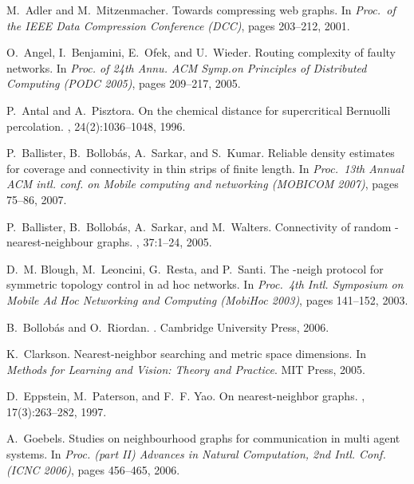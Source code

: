 \documentclass[11pt]{article}
\begin{document}

\begin{thebibliography}{10}

M.~Adler and M.~Mitzenmacher.
\newblock Towards compressing web graphs.
\newblock In {\em Proc.\ of the IEEE Data Compression Conference (DCC)}, pages
  203--212, 2001.

O.~Angel, I.~Benjamini, E.~Ofek, and U.~Wieder.
\newblock Routing complexity of faulty networks.
\newblock In {\em Proc. of 24th Annu. ACM Symp.on Principles of Distributed
  Computing (PODC 2005)}, pages 209--217, 2005.

P.~Antal and A.~Pisztora.
\newblock On the chemical distance for supercritical {Bernuolli} percolation.
, 24(2):1036--1048, 1996.

P.~Ballister, B.~Bollob\'as, A.~Sarkar, and S.~Kumar.
\newblock Reliable density estimates for coverage and connectivity in thin
  strips of finite length.
\newblock In {\em Proc.~13th Annual ACM intl. conf. on Mobile computing and
  networking (MOBICOM 2007)}, pages 75--86, 2007.

P.~Ballister, B.~Bollob\'as, A.~Sarkar, and M.~Walters.
\newblock Connectivity of random -nearest-neighbour graphs.
, 37:1--24, 2005.

D.~M. Blough, M.~Leoncini, G.~Resta, and P.~Santi.
\newblock The -neigh protocol for symmetric topology control in ad hoc
  networks.
\newblock In {\em Proc.~4th Intl. Symposium on Mobile Ad Hoc Networking and
  Computing (MobiHoc 2003)}, pages 141--152, 2003.

B.~Bollob\'as and O.~Riordan.
.
\newblock Cambridge University Press, 2006.

K.~Clarkson.
\newblock Nearest-neighbor searching and metric space dimensions.
\newblock In {\em Methods for Learning and Vision: Theory and Practice}. MIT
  Press, 2005.

D.~Eppstein, M.~Paterson, and F.~F. Yao.
\newblock On nearest-neighbor graphs.
, 17(3):263--282, 1997.

A.~Goebels.
\newblock Studies on neighbourhood graphs for communication in multi agent
  systems.
\newblock In {\em Proc. (part II) Advances in Natural Computation, 2nd Intl.
  Conf. (ICNC 2006)}, pages 456--465, 2006.


\end{thebibliography}
\end{document}

